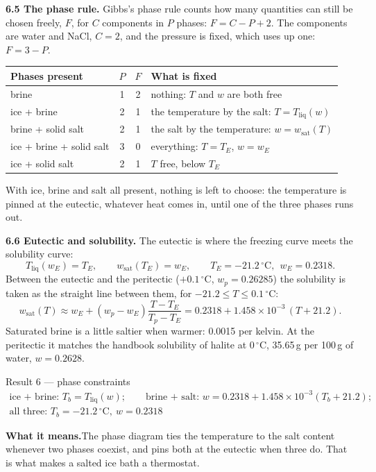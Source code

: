 \documentclass[11pt,a4paper]{article}
\newcommand{\Tliq}{T_{\mathrm{liq}}}
\newcommand{\wsat}{w_{\mathrm{sat}}}
\newcommand{\dC}{\,{}^{\circ}\mathrm{C}}
\newcommand{\sub}[1]{\par\smallskip\noindent\textbf{#1}\enspace}
\newcommand{\means}{\par\noindent\textbf{What it means.}\enspace}
\begin{document}
\sub{6.5 The phase rule.} Gibbs's phase rule counts how many quantities can still be chosen freely, $F$,
for $C$ components in $P$ phases: $F = C - P + 2$. The components are water and NaCl, $C = 2$, and the
pressure is fixed, which uses up one: $F = 3 - P$.

{\small
\begin{tabularx}{\linewidth}{X c c X}
\toprule
Phases present & $P$ & $F$ & What is fixed \\
\midrule
brine & 1 & 2 & nothing: $T$ and $w$ are both free \\
ice + brine & 2 & 1 & the temperature by the salt: $T = \Tliq(w)$ \\
brine + solid salt & 2 & 1 & the salt by the temperature: $w = \wsat(T)$ \\
ice + brine + solid salt & 3 & 0 & everything: $T=T_E$, $w=w_E$ \\
ice + solid salt & 2 & 1 & $T$ free, below $T_E$ \\
\bottomrule
\end{tabularx}}

With ice, brine and salt all present, nothing is left to choose: the temperature is pinned at the
eutectic, whatever heat comes in, until one of the three phases runs out.

\sub{6.6 Eutectic and solubility.} The eutectic is where the freezing curve meets the solubility curve:
\[
\Tliq(w_E) = T_E,\qquad \wsat(T_E) = w_E,\qquad T_E = -21.2\dC,\ \ w_E = 0.2318 .
\]
Between the eutectic and the peritectic ($+0.1\dC$, $w_p = 0.26285$) the solubility is taken as the straight
line between them, for $-21.2 \le T \le 0.1\dC$:
\[
\wsat(T) \approx w_E + (w_p - w_E)\frac{T - T_E}{T_p - T_E} = 0.2318 + 1.458\times10^{-3}\,(T + 21.2) .
\]
Saturated brine is a little saltier when warmer: 0.0015 per kelvin. At the peritectic it matches the
handbook solubility of halite at $0\dC$, 35.65\,g per 100\,g of water, $w = 0.2628$.

\begin{result}{Result 6 --- phase constraints}
\begin{gather*}
\text{ice + brine: } T_b = \Tliq(w);\qquad \text{brine + salt: } w = 0.2318 + 1.458\times10^{-3}(T_b + 21.2);\\
\text{all three: } T_b = -21.2\dC,\ w = 0.2318
\end{gather*}
\end{result}
\means The phase diagram ties the temperature to the salt content whenever two phases coexist, and pins
both at the eutectic when three do. That is what makes a salted ice bath a thermostat.
\end{document}
